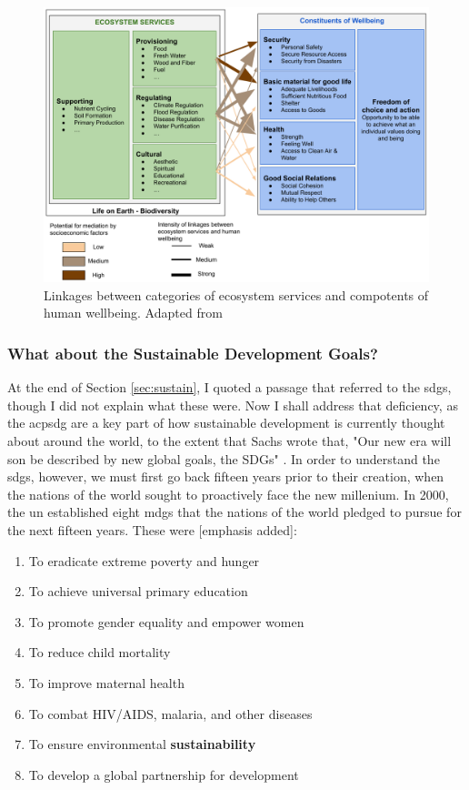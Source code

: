 \begin{figure}[h]
	\centering
	\includegraphics[scale=0.35]{Figures/chap2/services_wellbeing.png}
	\caption[Linkages between categories of ecosystem services and compotents of human wellbeing]{Linkages between categories of ecosystem services and compotents of human wellbeing. Adapted from \cite{reidEcosystemsHumanWellbeing2005}}
	\label{fig:services_wellbeing}
\end{figure}

\subsubsection{What about the Sustainable Development Goals?}

At the end of Section \ref{sec:sustain}, I quoted a passage that referred to the \acp{sdg}, though I did not explain what these were. Now I shall address that deficiency, as the acp{sdg} are a key part of how sustainable development is currently thought about around the world, to the extent that Sachs wrote that, "Our new era will son be described by new global goals, the SDGs" \cite{sachsAgeSustainableDevelopment2015}. In order to understand the \acp{sdg}, however, we must first go back fifteen years prior to their creation, when the nations of the world sought to proactively face the new millenium. In 2000, the \ac{un} established eight \acp{mdg} that the nations of the world pledged to pursue for the next fifteen years. These were [emphasis added]:

\begin{enumerate} \setlength{\itemsep}{0pt} \setlength{\parskip}{0pt}
	\item To eradicate extreme poverty and hunger
	\item To achieve universal primary education
	\item To promote gender equality and empower women
	\item To reduce child mortality
	\item To improve maternal health
	\item To combat HIV/AIDS, malaria, and other diseases
	\item To ensure environmental \textbf{sustainability}
	\item To develop a global partnership for development
\end{enumerate}
    

